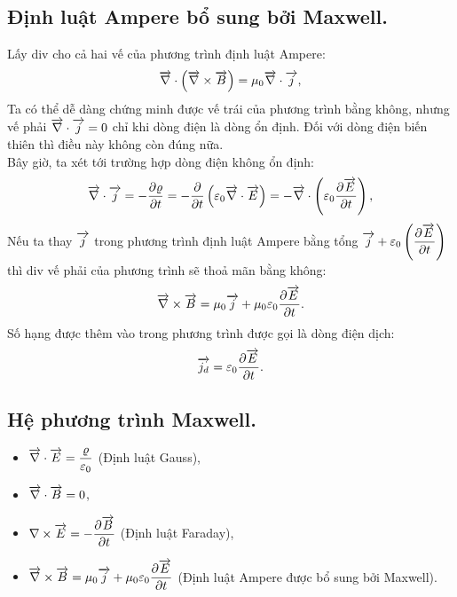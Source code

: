 \begin{appendices}
 \subsection{Định luật Ampere bổ sung bởi Maxwell.}
 	Lấy div cho cả hai vế của phương trình định luật Ampere:
 	$$\overrightarrow{\nabla}\cdot\left(\overrightarrow{\nabla}\times\overrightarrow{B}\right)= \mu_0\overrightarrow{\nabla}\cdot\overrightarrow{j},$$
 	Ta có thể dễ dàng chứng minh được vế trái của phương trình bằng không, nhưng vế phải $\overrightarrow{\nabla}\cdot\overrightarrow{j}=0$ chỉ khi dòng điện là dòng ổn định. Đối với dòng điện biến thiên thì điều này không còn đúng nữa.\\
 	Bây giờ, ta xét tới trường hợp dòng điện không ổn định:
	 $$\overrightarrow{\nabla}\cdot\overrightarrow{j}=-\dfrac{\partial\varrho}{\partial t}=-\dfrac{\partial}{\partial t}\left(\varepsilon_0\overrightarrow{\nabla}\cdot\overrightarrow{E}\right)=-\overrightarrow{\nabla}\cdot\left(\varepsilon_0\dfrac{\partial \overrightarrow{E}}{\partial t}\right),$$
	Nếu ta thay $\overrightarrow{j}$ trong phương trình định luật Ampere bằng tổng $\overrightarrow{j}+\varepsilon_0 \left(\dfrac{\partial\overrightarrow{E}}{\partial t}\right)$ thì div vế phải của phương trình sẽ thoả mãn bằng không:
	$$\overrightarrow{\nabla}\times\overrightarrow{B}=\mu_0\overrightarrow{j}+\mu_0\varepsilon_0\dfrac{\partial \overrightarrow{E}}{\partial t}.$$
	Số hạng được thêm vào trong phương trình được gọi là dòng điện dịch:
	$$\overrightarrow{j_d}=\varepsilon_0\dfrac{\partial \overrightarrow{E}}{\partial t}.$$
\subsection{Hệ phương trình Maxwell.}
	\begin{itemize}
		\item $\overrightarrow{\nabla}\cdot\overrightarrow{E}=\dfrac{\varrho}{\varepsilon_0} $ (Định luật Gauss),
		\item $\overrightarrow{\nabla}\cdot\overrightarrow{B}=0$,
		\item $\nabla \times \overrightarrow{E}= - \dfrac{\partial \overrightarrow{B}}{\partial t}$ (Định luật Faraday),
		\item $\overrightarrow{\nabla}\times\overrightarrow{B}= \mu_0\overrightarrow{j}+\mu_0\varepsilon_0\dfrac{\partial \overrightarrow{E}}{\partial t}$ (Định luật Ampere được bổ sung bởi Maxwell).
	 \end{itemize}

\end{appendices}
